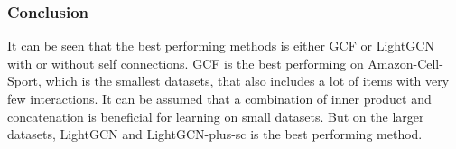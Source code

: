 \subsubsection{Conclusion}
It can be seen that the best performing methods is either GCF or LightGCN with or without self connections.
GCF is the best performing on Amazon-Cell-Sport, which is the smallest datasets, that also includes a lot of items with very few interactions.
It can be assumed that a combination of inner product and concatenation is beneficial for learning on small datasets.
But on the larger datasets, LightGCN and LightGCN-plus-sc is the best performing method.